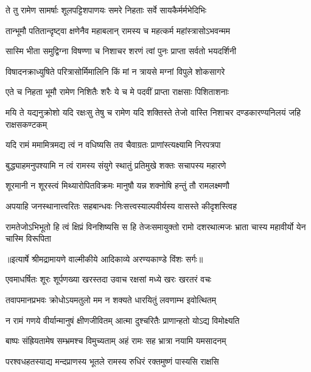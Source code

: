 \twolineshloka
{ते तु रामेण सामर्षाः शूलपट्टिशपाणयः}
{समरे निहताः सर्वे सायकैर्मर्मभेदिभिः} %

\twolineshloka
{तान्भूमौ पतितान्दृष्ट्वा क्षणेनैव महाबलान्}
{रामस्य च महत्कर्म महांस्त्रासोऽभवन्मम} %

\twolineshloka
{सास्मि भीता समुद्विग्ना विषण्णा च निशाचर}
{शरणं त्वां पुनः प्राप्ता सर्वतो भयदर्शिनी} %

\twolineshloka
{विषादनक्राध्युषिते परित्रासोर्मिमालिनि}
{किं मां न त्रायसे मग्नां विपुले शोकसागरे} %

\twolineshloka
{एते च निहता भूमौ रामेण निशितैः शरैः}
{ये च मे पदवीं प्राप्ता राक्षसाः पिशिताशनाः} %

\threelineshloka
{मयि ते यद्यनुक्रोशो यदि रक्षःसु तेषु च}
{रामेण यदि शक्तिस्ते तेजो वास्ति निशाचर}
{दण्डकारण्यनिलयं जहि राक्षसकण्टकम्} %

\twolineshloka
{यदि रामं ममामित्रमद्य त्वं न वधिष्यसि}
{तव चैवाग्रतः प्राणांस्त्यक्ष्यामि निरपत्रपा} %

\twolineshloka
{बुद्ध्याहमनुपश्यामि न त्वं रामस्य संयुगे}
{स्थातुं प्रतिमुखे शक्तः सचापस्य महारणे} %

\twolineshloka
{शूरमानी न शूरस्त्वं मिथ्यारोपितविक्रमः}
{मानुषौ यन्न शक्नोषि हन्तुं तौ रामलक्ष्मणौ} %

\twolineshloka
{अपयाहि जनस्थानात्त्वरितः सहबान्धवः}
{निःसत्त्वस्याल्पवीर्यस्य वासस्ते कीदृशस्त्विह} %

\threelineshloka
{रामतेजोऽभिभूतो हि त्वं क्षिप्रं विनशिष्यसि}
{स हि तेजःसमायुक्तो रामो दशरथात्मजः}
{भ्राता चास्य महावीर्यो येन चास्मि विरूपिता} %


{॥इत्यार्षे श्रीमद्रामायणे वाल्मीकीये आदिकाव्ये अरण्यकाण्डे विंशः सर्गः॥}


\twolineshloka
{एवमाधर्षितः शूरः शूर्पणख्या खरस्तदा}
{उवाच रक्षसां मध्ये खरः खरतरं वचः} %

\twolineshloka
{तवापमानप्रभवः क्रोधोऽयमतुलो मम}
{न शक्यते धारयितुं लवणाम्भ इवोत्थितम्} %

\twolineshloka
{न रामं गणये वीर्यान्मानुषं क्षीणजीवितम्}
{आत्मा दुश्चरितैः प्राणान्हतो योऽद्य विमोक्ष्यति} %

\twolineshloka
{बाष्पः संह्रियतामेष सम्भ्रमश्च विमुच्यताम्}
{अहं रामः सह भ्रात्रा नयामि यमसादनम्} %

\twolineshloka
{परश्वधहतस्याद्य मन्दप्राणस्य भूतले}
{रामस्य रुधिरं रक्तमुष्णं पास्यसि राक्षसि} %

